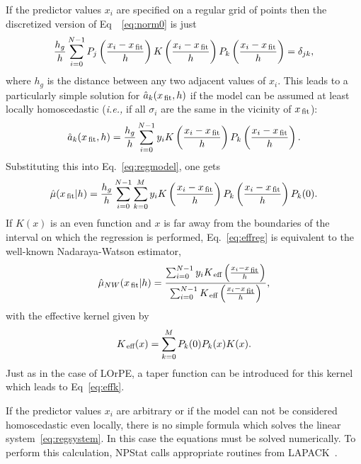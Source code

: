 \documentclass[12pt,titlepage]{article}
\newcommand{\sub}[1]{\ensuremath{_{\mbox{\scriptsize \,#1}}}}
\begin{document}
If the predictor values $x_i$ are specified on a regular grid of points
then the discretized version of Eq~~\ref{eq:norm0} is just
\begin{equation}
\frac{h_g}{h} \sum_{i=0}^{N-1} P_j\left(\frac{x_i - x\sub{fit}}{h} \right)  K\left(\frac{x_i - x\sub{fit}}{h}\right) P_k\left(\frac{x_i - x\sub{fit}}{h}\right) = \delta_{jk},
\end{equation}
where $h_g$ is the distance between any two adjacent values of $x_i$.
This leads to a particularly simple solution for $\hat{a}_k(x\sub{fit},h)$
if the model can be assumed at least locally homoscedastic
({\it i.e.,} if all $\sigma_i$ are the same in the vicinity of $x\sub{fit}$):
\begin{equation}
\hat{a}_k(x\sub{fit},h) = \frac{h_g}{h} \sum_{i=0}^{N-1} y_i  K\left(\frac{x_i - x\sub{fit}}{h}\right) P_k\left(\frac{x_i - x\sub{fit}}{h}\right).
\label{eq:regconvol}
\end{equation}
Substituting this into Eq.~\ref{eq:regmodel}, one gets
\begin{equation}
\hat{\mu}(x\sub{fit} | h) = \frac{h_g}{h} \sum_{i=0}^{N-1} \sum_{k=0}^{M} y_i  K\left(\frac{x_i - x\sub{fit}}{h}\right) P_k\left(\frac{x_i - x\sub{fit}}{h}\right) P_k(0).
\label{eq:effreg}
\end{equation}
If $K(x)$ is an even function and $x$ is far away from
the boundaries of the interval on which the regression is performed,
Eq.~\ref{eq:effreg} is equivalent to the well-known Nadaraya-Watson estimator,
\begin{equation}
\hat{\mu}_{NW}(x\sub{fit} | h) = \frac{\sum_{i=0}^{N-1} y_i K\sub{eff}\left(\frac{x_i - x\sub{fit}}{h}\right)}{\sum_{i=0}^{N-1} K\sub{eff}\left(\frac{x_i - x\sub{fit}}{h}\right)},
\end{equation}
with the effective kernel given by
\begin{equation}
K\sub{eff}(x) = \sum_{k=0}^{M} P_{k}(0) P_{k}(x) K(x).
\end{equation}
Just as in the case of LOrPE, a taper function can be introduced
for this kernel which leads to Eq~\ref{eq:effk}.

If the predictor values $x_i$ are arbitrary or if the model can not
be considered homoscedastic even locally, there is no
simple formula which solves the linear system~\ref{eq:regsystem}.
In this case the equations must be solved numerically.
To perform this calculation, NPStat calls appropriate routines
from LAPACK~\cite{ref:lapack}.
\end{document}
